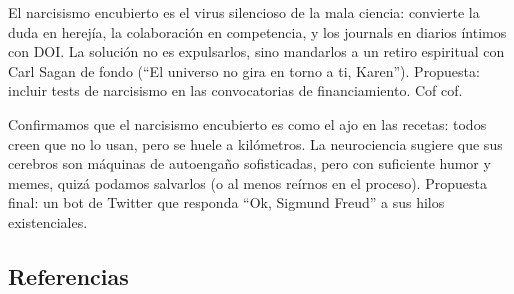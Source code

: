 \documentclass[
]{article}
\begin{document}
El narcisismo encubierto es el virus silencioso de la mala ciencia:
convierte la duda en herejía, la colaboración en competencia, y los
journals en diarios íntimos con DOI. La solución no es expulsarlos, sino
mandarlos a un retiro espiritual con Carl Sagan de fondo (``El universo
no gira en torno a ti, Karen''). Propuesta: incluir tests de narcisismo
en las convocatorias de financiamiento. Cof cof.

Confirmamos que el narcisismo encubierto es como el ajo en las recetas:
todos creen que no lo usan, pero se huele a kilómetros. La neurociencia
sugiere que sus cerebros son máquinas de autoengaño sofisticadas, pero
con suficiente humor y memes, quizá podamos salvarlos (o al menos
reírnos en el proceso). Propuesta final: un bot de Twitter que responda
``Ok, Sigmund Freud'' a sus hilos existenciales.

\subsection*{Referencias}\label{referencias}
\end{document}
